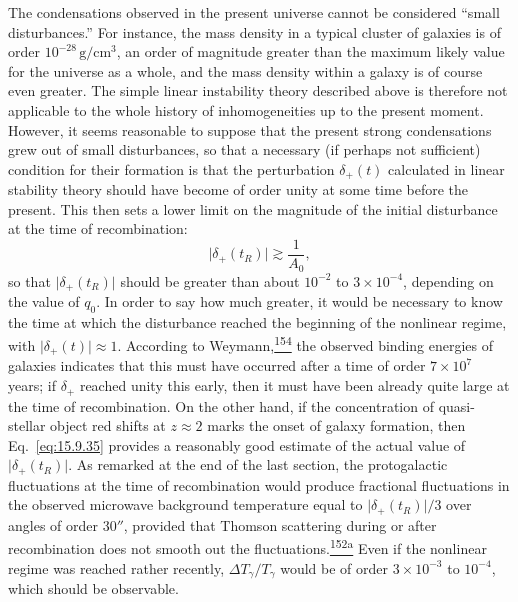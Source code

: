 The condensations observed in the present universe cannot be considered
``small disturbances.'' For instance, the mass density in a typical cluster
of galaxies is of order \(10^{-28}\,\mathrm{g/cm^3}\), an order of magnitude
greater than the maximum likely value for the universe as a whole, and the mass
density within a galaxy is of course even greater. The simple linear
instability theory described above is therefore not applicable to the whole
history of inhomogeneities up to the present moment. However, it seems
reasonable to suppose that the present strong condensations grew out of small
disturbances, so that a necessary (if perhaps not sufficient) condition for
their formation is that the perturbation \(\delta_+(t)\) calculated in linear
stability theory should have become of order unity at some time before the
present. This then sets a lower limit on the magnitude of the initial
disturbance at the time of recombination:
\begin{equation}
  \lvert\delta_+(t_R)\rvert\gtrsim\frac1{A_0},
  \tag{15.9.35}\label{eq:15.9.35}
\end{equation}
so that \(\lvert\delta_+(t_R)\rvert\) should be greater than about
\(10^{-2}\) to \(3\times10^{-4}\), depending on the value of \(q_0\). In
order to say how much greater, it would be necessary to know the time at which
the disturbance reached the beginning of the nonlinear regime, with
\(\lvert\delta_+(t)\rvert\approx1\). According to
Weymann,\hyperref[ch15-ref-154]{\textsuperscript{154}} the observed binding
energies of galaxies indicates that this must have occurred after a time of
order \(7\times10^7\) years; if \(\delta_+\) reached unity this early, then
it must have been already quite large at the time of recombination. On the
other hand, if the concentration of quasi-stellar object red shifts at
\(z\approx2\) marks the onset of galaxy formation, then
Eq.~\eqref{eq:15.9.35} provides a reasonably good estimate of the actual
value of \(\lvert\delta_+(t_R)\rvert\). As remarked at the end of the last
section, the protogalactic fluctuations at the time of recombination would
produce fractional fluctuations in the observed microwave background
temperature equal to \(\lvert\delta_+(t_R)\rvert/3\) over angles of order
\(30''\), provided that Thomson scattering during or after recombination does
not smooth out the
fluctuations.\hyperref[ch15-ref-152a]{\textsuperscript{152a}} Even if the
nonlinear regime was reached rather recently, \(\Delta T_\gamma/T_\gamma\)
would be of order \(3\times10^{-3}\) to \(10^{-4}\), which should be
observable.

